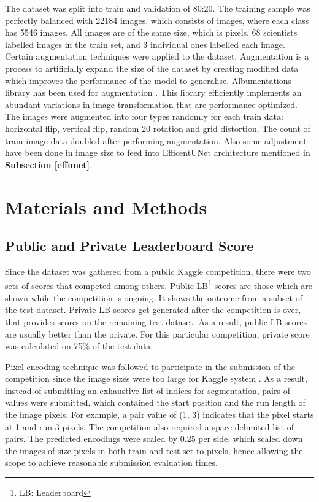 \documentclass[conference]{IEEEtran}
\begin{document}
The dataset was split into train and validation of 80:20. The training sample was perfectly balanced with 22184 images, which consists of  images, where each class has 5546 images. All images are of the same size, which is  pixels. 68 scientists labelled images in the train set, and 3 individual ones labelled each image. Certain augmentation techniques were applied to the dataset. Augmentation is a process to artificially expand the size of the dataset by creating modified data which improves the performance of the model to generalise. Albumentations library has been used for augmentation \cite{buslaev2020albumentations}. This library efficiently implements an abundant variations in image transformation that are performance optimized. The images were augmented into four types randomly for each train data: horizontal flip, vertical flip, random 20 rotation and grid distortion. The count of train image data doubled after performing augmentation. Also some adjustment have been done in image size to feed into EfficentUNet architecture mentioned in \textbf{Subsection \ref{effunet}}. 
















\section{Materials and Methods \label{evaluation}}



\subsection{Public and Private Leaderboard Score}
Since the dataset was gathered from a public Kaggle competition, there were two sets of scores that competed among others. Public LB\footnote{LB: Leaderboard} scores are those which are shown while the competition is ongoing. It shows the outcome from a subset of the test dataset. Private LB scores get generated after the competition is over, that provides scores on the remaining test dataset. As a result, public LB scores are usually better than the private. For this particular competition, private score was calculated on 75\% of the test data. 

Pixel encoding technique was followed to participate in the submission of the competition since the image sizes were too large for Kaggle system  \cite{richards1993method}. As a result, instead of submitting an exhaustive list of indices for segmentation, pairs of values were submitted, which contained the start position and the run length of the image pixels. For example, a pair value of (1, 3) indicates that the pixel starts at 1 and run 3 pixels. The competition also required a space-delimited list of pairs. The predicted encodings were scaled by 0.25 per side, which scaled down the images of size  pixels in both train and test set to  pixels, hence allowing the scope to achieve reasonable submission evaluation times.
\end{document}
